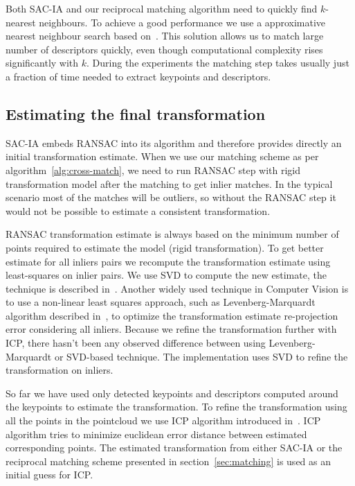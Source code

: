 Both \gls{SAC-IA} and our reciprocal matching algorithm need to quickly find $k$-nearest neighbours. To achieve a good performance we use a approximative nearest neighbour search based on~\citet{muja2014flann}. This solution allows us to match large number of descriptors quickly, even though computational complexity rises significantly with $k$. During the experiments the matching step takes usually just a fraction of time needed to extract keypoints and descriptors.

\subsection{Estimating the final transformation}
\label{sec:final-estimation}

\gls{SAC-IA} embeds \gls{RANSAC} into its algorithm and therefore provides directly an initial transformation estimate. When we use our matching scheme as per algorithm~\ref{alg:cross-match}, we need to run \gls{RANSAC} step with rigid transformation model after the matching to get inlier matches. In the typical scenario most of the matches will be outliers, so without the \gls{RANSAC} step it would not be possible to estimate a consistent transformation.

\gls{RANSAC} transformation estimate is always based on the minimum number of points required to estimate the model (rigid transformation). To get better estimate for all inliers pairs we recompute the transformation estimate using least-squares on inlier pairs. We use \gls{SVD} to compute the new estimate, the technique is described in~\citet{golub1970svd}. Another widely used technique in Computer Vision is to use a non-linear least squares approach, such as Levenberg-Marquardt algorithm described in~\citet{more1978levmarq}, to optimize the transformation estimate re-projection error considering all inliers. Because we refine the transformation further with \gls{ICP}, there hasn't been any observed difference between using Levenberg-Marquardt or \gls{SVD}-based technique. The implementation uses \gls{SVD} to refine the transformation on inliers.

So far we have used only detected keypoints and descriptors computed around the keypoints to estimate the transformation. To refine the transformation using all the points in the pointcloud we use \gls{ICP} algorithm introduced in~\citet{besl1992icp}. \gls{ICP} algorithm tries to minimize euclidean error distance between estimated corresponding points. The estimated transformation from either \gls{SAC-IA} or the reciprocal matching scheme presented in section~\ref{sec:matching} is used as an initial guess for \gls{ICP}.

